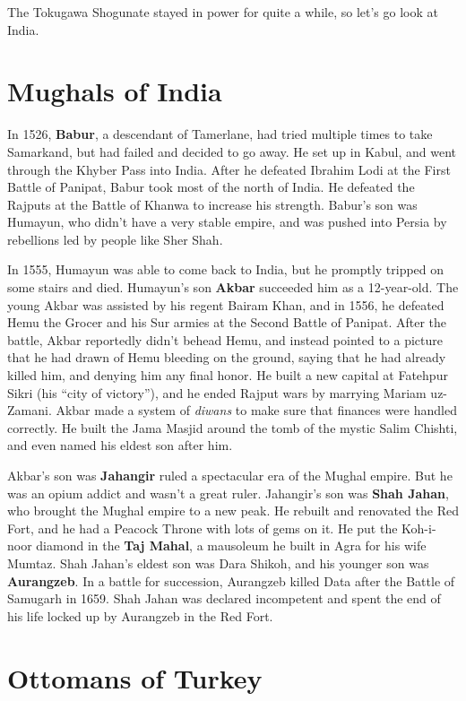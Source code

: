 The Tokugawa Shogunate stayed in power for quite a while, so let's go look at India.

\section{Mughals of India}

In 1526, \textbf{Babur}, a descendant of Tamerlane,
had tried multiple times to take Samarkand, but had failed and decided to go away.
He set up in Kabul, and went through the Khyber Pass into India.
After he defeated Ibrahim Lodi at the First Battle of Panipat, Babur took most of the north of India.
He defeated the Rajputs at the Battle of Khanwa to increase his strength.
Babur's son was Humayun, who didn't have a very stable empire,
and was pushed into Persia by rebellions led by people like Sher Shah.

In 1555, Humayun was able to come back to India, but he promptly tripped on some stairs and died.
Humayun's son \textbf{Akbar} succeeded him as a 12-year-old.
The young Akbar was assisted by his regent Bairam Khan,
and in 1556, he defeated Hemu the Grocer and his Sur armies at the Second Battle of Panipat.
After the battle, Akbar reportedly didn't behead Hemu,
and instead pointed to a picture that he had drawn of Hemu bleeding on the ground,
saying that he had already killed him, and denying him any final honor.
He built a new capital at Fatehpur Sikri (his ``city of victory''),
and he ended Rajput wars by marrying Mariam uz-Zamani.
Akbar made a system of \textit{diwans} to make sure that finances were handled correctly.
He built the Jama Masjid around the tomb of the mystic Salim Chishti,
and even named his eldest son after him.

Akbar's son was \textbf{Jahangir} ruled a spectacular era of the Mughal empire.
But he was an opium addict and wasn't a great ruler.
Jahangir's son was \textbf{Shah Jahan}, who brought the Mughal empire to a new peak.
He rebuilt and renovated the Red Fort, and he had a Peacock Throne with lots of gems on it.
He put the Koh-i-noor diamond in the \textbf{Taj Mahal}, a mausoleum he built in Agra for his wife Mumtaz.
Shah Jahan's eldest son was Dara Shikoh, and his younger son was \textbf{Aurangzeb}.
In a battle for succession, Aurangzeb killed Data after the Battle of Samugarh in 1659.
Shah Jahan was declared incompetent and spent the end of his life locked up by Aurangzeb in the Red Fort.

\section{Ottomans of Turkey}
